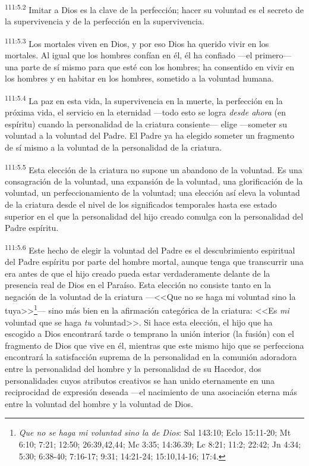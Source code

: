 \documentclass[twoside, 11pt]{book}
\begin{document}
\par
\textsuperscript{111:5.2} Imitar a Dios es la clave de la perfección; hacer su voluntad es el secreto de la supervivencia y de la perfección en la supervivencia.

\par
\textsuperscript{111:5.3} Los mortales viven en Dios, y por eso Dios ha querido vivir en los mortales. Al igual que los hombres confían en él, él ha confiado ---el primero--- una parte de sí mismo para que esté con los hombres; ha consentido en vivir en los hombres y en habitar en los hombres, sometido a la voluntad humana.

\par
\textsuperscript{111:5.4} La paz en esta vida, la supervivencia en la muerte, la perfección en la próxima vida, el servicio en la eternidad ---todo esto se logra \textit{desde ahora} (en espíritu) cuando la personalidad de la criatura consiente--- elige ---someter su voluntad a la voluntad del Padre. El Padre ya ha elegido someter un fragmento de sí mismo a la voluntad de la personalidad de la criatura.

\par
\textsuperscript{111:5.5} Esta elección de la criatura no supone un abandono de la voluntad. Es una consagración de la voluntad, una expansión de la voluntad, una glorificación de la voluntad, un perfeccionamiento de la voluntad; una elección así eleva la voluntad de la criatura desde el nivel de los significados temporales hasta ese estado superior en el que la personalidad del hijo creado comulga con la personalidad del Padre espíritu.

\par
\textsuperscript{111:5.6} Este hecho de elegir la voluntad del Padre es el descubrimiento espiritual del Padre espíritu por parte del hombre mortal, aunque tenga que transcurrir una era antes de que el hijo creado pueda estar verdaderamente delante de la presencia real de Dios en el Paraíso. Esta elección no consiste tanto en la negación de la voluntad de la criatura ---<<Que no se haga mi voluntad sino la tuya>>\footnote{\textit{Que no se haga mi voluntad sino la de Dios}: Sal 143:10; Eclo 15:11-20; Mt 6:10; 7:21; 12:50; 26:39,42,44; Mc 3:35; 14:36.39; Lc 8:21; 11:2; 22:42; Jn 4:34; 5:30; 6:38-40; 7:16-17; 9:31; 14:21-24; 15:10,14-16; 17:4.}--- sino más bien en la afirmación categórica de la criatura: <<Es \textit{mi} voluntad que se haga \textit{tu} voluntad>>. Si hace esta elección, el hijo que ha escogido a Dios encontrará tarde o temprano la unión interior (la fusión) con el fragmento de Dios que vive en él, mientras que este mismo hijo que se perfecciona encontrará la satisfacción suprema de la personalidad en la comunión adoradora entre la personalidad del hombre y la personalidad de su Hacedor, dos personalidades cuyos atributos creativos se han unido eternamente en una reciprocidad de expresión deseada ---el nacimiento de una asociación eterna más entre la voluntad del hombre y la voluntad de Dios.
\end{document}
